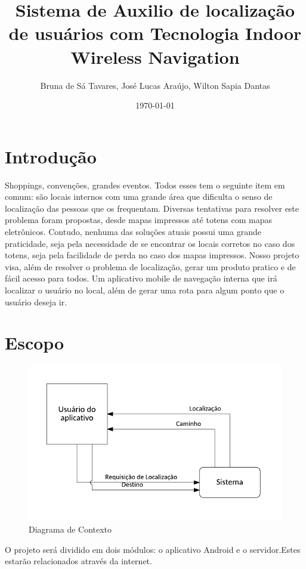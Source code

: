 \documentclass[12pt]{article}
\begin{document}
\title{Sistema de Auxilio de localização de usuários com Tecnologia Indoor Wireless Navigation}
\author{Bruna de Sá Tavares, José Lucas Araújo, Wilton Sapia Dantas}
\date{\today}
\maketitle  

\section*{Introdução}
	Shoppings, convenções, grandes eventos. Todos esses tem o seguinte item em comum: são locais internos com uma grande área que dificulta o senso de localização das pessoas que os frequentam. Diversas tentativas para resolver este problema foram propostas, desde mapas impressos até totens com mapas eletrônicos. Contudo, nenhuma das soluções atuais possui uma grande praticidade, seja pela necessidade de se encontrar os locais corretos no caso dos totens, seja pela facilidade de perda no caso dos mapas impressos. Nosso projeto visa, além de resolver o problema de localização, gerar um produto pratico e de fácil acesso para todos. Um aplicativo mobile de navegação interna que irá localizar o usuário no local, além de gerar uma rota para algum ponto que o usuário deseja ir.

\section*{Escopo}
	\begin{figure}
		\centering
		\includegraphics[scale=0.5]{diagramaContexto.PNG}
		\caption{Diagrama de Contexto}
	\end{figure}
	O projeto será dividido em dois módulos: o aplicativo Android e o servidor.Estes estarão relacionados através da internet.
\end{document}
